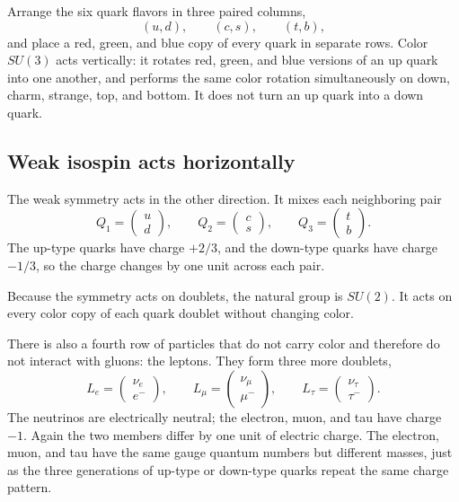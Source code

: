 Arrange the six quark flavors in three paired columns,
\begin{equation}
(u,d),\qquad(c,s),\qquad(t,b),
\end{equation}
and place a red, green, and blue copy of every quark in separate rows. Color
\(SU(3)\) acts vertically: it rotates red, green, and blue versions of an up
quark into one another, and performs the same color rotation simultaneously
on down, charm, strange, top, and bottom. It does not turn an up quark into a
down quark.

\subsection{Weak isospin acts horizontally}

The weak symmetry acts in the other direction. It mixes each neighboring pair
\begin{equation}
Q_1=\begin{pmatrix}u\\d\end{pmatrix},
\qquad
Q_2=\begin{pmatrix}c\\s\end{pmatrix},
\qquad
Q_3=\begin{pmatrix}t\\b\end{pmatrix}.
\label{eq:l5-quark-doublets}
\end{equation}
The up-type quarks have charge \(+2/3\), and the down-type quarks have charge
\(-1/3\), so the charge changes by one unit across each pair.

Because the symmetry acts on doublets, the natural group is \(SU(2)\). It acts
on every color copy of each quark doublet without changing color.

There is also a fourth row of particles that do not carry color and therefore
do not interact with gluons: the leptons. They form three more doublets,
\begin{equation}
L_e=\begin{pmatrix}\nu_e\\e^-\end{pmatrix},
\qquad
L_\mu=\begin{pmatrix}\nu_\mu\\\mu^-\end{pmatrix},
\qquad
L_\tau=\begin{pmatrix}\nu_\tau\\\tau^-\end{pmatrix}.
\label{eq:l5-lepton-doublets}
\end{equation}
The neutrinos are electrically neutral; the electron, muon, and tau have
charge \(-1\). Again the two members differ by one unit of electric charge.
The electron, muon, and tau have the same gauge quantum numbers but different
masses, just as the three generations of up-type or down-type quarks repeat
the same charge pattern.

